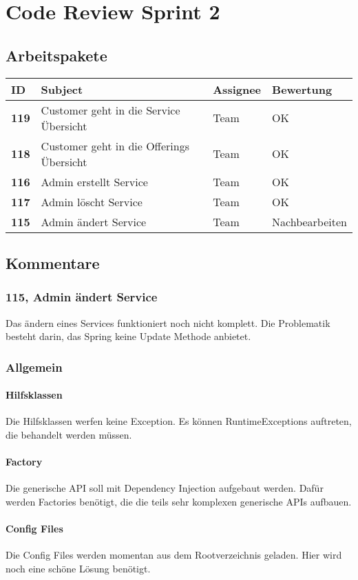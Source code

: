 
\chapter{Code Review Sprint 2}
\section{Arbeitspakete}

\begin{center}

\begin{tabularx}{\linewidth}{l l l l}
\textbf{ID} & \textbf{Subject} & \textbf{Assignee} & \textbf{Bewertung}\\
\hline
\textbf{119} & Customer geht in die Service Übersicht & Team & OK \\
\textbf{118} & Customer geht in die Offerings Übersicht & Team & OK\\
\textbf{116} & Admin erstellt Service & Team & OK\\
\textbf{117} & Admin löscht Service & Team & OK\\
\textbf{115} & Admin ändert Service & Team & Nachbearbeiten\\
\end{tabularx}

\end{center}
\newpage

\section{Kommentare}

\subsection{115, Admin ändert Service}
Das ändern eines Services funktioniert noch nicht komplett. Die Problematik besteht darin, das Spring keine Update Methode anbietet.

\subsection{Allgemein}
\subsubsection{Hilfsklassen}
Die Hilfsklassen werfen keine Exception.
Es können RuntimeExceptions auftreten, die behandelt werden müssen.

\subsubsection{Factory}
Die generische API soll mit Dependency Injection aufgebaut werden.
Dafür werden Factories benötigt, die die teils sehr komplexen generische APIs aufbauen.

\subsubsection{Config Files}
Die Config Files werden momentan aus dem Rootverzeichnis geladen.
Hier wird noch eine schöne Lösung benötigt.
